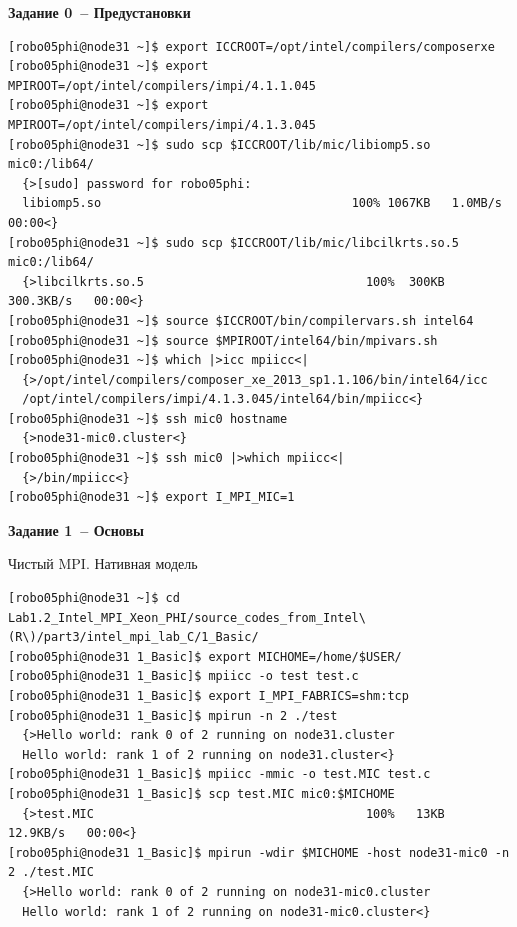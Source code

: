 \documentclass[pscyr,10pt]{hedlab}
\date{28 октября 2014 г.}
\begin{document}
  \makeheader
  
  \begin{center}
    \textbf{Задание 0~-- Предустановки}
  \end{center}
  
\begin{lstlisting}
[robo05phi@node31 ~]$ export ICCROOT=/opt/intel/compilers/composerxe
[robo05phi@node31 ~]$ export MPIROOT=/opt/intel/compilers/impi/4.1.1.045
[robo05phi@node31 ~]$ export MPIROOT=/opt/intel/compilers/impi/4.1.3.045
[robo05phi@node31 ~]$ sudo scp $ICCROOT/lib/mic/libiomp5.so mic0:/lib64/
  {>[sudo] password for robo05phi:
  libiomp5.so                                   100% 1067KB   1.0MB/s   00:00<}
[robo05phi@node31 ~]$ sudo scp $ICCROOT/lib/mic/libcilkrts.so.5 mic0:/lib64/
  {>libcilkrts.so.5                               100%  300KB 300.3KB/s   00:00<}
[robo05phi@node31 ~]$ source $ICCROOT/bin/compilervars.sh intel64
[robo05phi@node31 ~]$ source $MPIROOT/intel64/bin/mpivars.sh
[robo05phi@node31 ~]$ which |>icc mpiicc<|
  {>/opt/intel/compilers/composer_xe_2013_sp1.1.106/bin/intel64/icc
  /opt/intel/compilers/impi/4.1.3.045/intel64/bin/mpiicc<}
[robo05phi@node31 ~]$ ssh mic0 hostname
  {>node31-mic0.cluster<}
[robo05phi@node31 ~]$ ssh mic0 |>which mpiicc<|
  {>/bin/mpiicc<}
[robo05phi@node31 ~]$ export I_MPI_MIC=1
\end{lstlisting}
  
  \begin{center}
    \textbf{Задание 1~-- Основы}
    
    Чистый MPI. Нативная модель
  \end{center}

\begin{lstlisting}
[robo05phi@node31 ~]$ cd Lab1.2_Intel_MPI_Xeon_PHI/source_codes_from_Intel\(R\)/part3/intel_mpi_lab_C/1_Basic/
[robo05phi@node31 1_Basic]$ export MICHOME=/home/$USER/
[robo05phi@node31 1_Basic]$ mpiicc -o test test.c
[robo05phi@node31 1_Basic]$ export I_MPI_FABRICS=shm:tcp
[robo05phi@node31 1_Basic]$ mpirun -n 2 ./test
  {>Hello world: rank 0 of 2 running on node31.cluster
  Hello world: rank 1 of 2 running on node31.cluster<}
[robo05phi@node31 1_Basic]$ mpiicc -mmic -o test.MIC test.c
[robo05phi@node31 1_Basic]$ scp test.MIC mic0:$MICHOME
  {>test.MIC                                      100%   13KB  12.9KB/s   00:00<}
[robo05phi@node31 1_Basic]$ mpirun -wdir $MICHOME -host node31-mic0 -n 2 ./test.MIC
  {>Hello world: rank 0 of 2 running on node31-mic0.cluster
  Hello world: rank 1 of 2 running on node31-mic0.cluster<}
\end{lstlisting}
  
\end{document}
